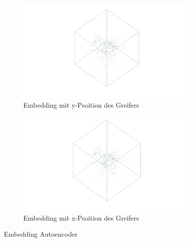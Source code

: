 	  \begin{figure}[h]
		\centering
		\begin{subfigure}[c]{0.49\textwidth}			
			\includegraphics[width=1\textwidth,center]{bilder/Hauptteil/Autoencoder_Grappel_Detection/y_embKopie.png}
			\caption{Embedding mit y-Psoition des Greifers}
			\label{img:BoxPlot_RegressionAufAutoencoder}	
		\end{subfigure}
		\begin{subfigure}[c]{0.49\textwidth}			
			\includegraphics[width=1\textwidth, center]{bilder/Hauptteil/Autoencoder_Grappel_Detection/x_embKopie.png}
			\caption{Embedding mit x-Psoition des Greifers}
			\label{img:RecalllIoUt_RegressionAufAutoencoder}	
		\end{subfigure}
		\caption{Embedding Autoencoder}
		\label{img:EmbeddingAE}
	\end{figure}
	
